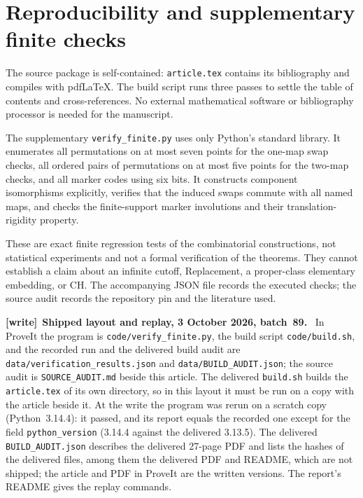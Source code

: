 \documentclass[11pt,letterpaper]{article}
\numberwithin{equation}{section}
\theoremstyle{plain}
\theoremstyle{definition}
\theoremstyle{remark}
\newenvironment{writenote}[1][]{\par\smallskip\begingroup\small\raggedright
 \setlength{\parindent}{1.25em}\noindent\textbf{[write]}\if\relax\detokenize{#1}\relax\else~\textbf{#1.}\fi\ }%
 {\par\endgroup\smallskip}
\begin{document}
\section{Reproducibility and supplementary finite checks}\label{nee:app:checks}
The source package is self-contained: \texttt{article.tex} contains its bibliography and compiles with pdfLaTeX. The build script runs three passes to settle the table of contents and cross-references. No external mathematical software or bibliography processor is needed for the manuscript.

The supplementary \texttt{verify\_finite.py} uses only Python's standard library. It enumerates all permutations on at most seven points for the one-map swap checks, all ordered pairs of permutations on at most five points for the two-map checks, and all marker codes using six bits. It constructs component isomorphisms explicitly, verifies that the induced swaps commute with all named maps, and checks the finite-support marker involutions and their translation-rigidity property.

These are exact finite regression tests of the combinatorial constructions, not statistical experiments and not a formal verification of the theorems. They cannot establish a claim about an infinite cutoff, Replacement, a proper-class elementary embedding, or CH. The accompanying JSON file records the executed checks; the source audit records the repository pin and the literature used.

\begin{writenote}[Shipped layout and replay, 3 October 2026, batch~89]
In ProveIt the program is \nolinkurl{code/verify_finite.py}, the build script \nolinkurl{code/build.sh}, and the recorded run and the delivered build audit are \nolinkurl{data/verification_results.json} and \nolinkurl{data/BUILD_AUDIT.json}; the source audit is \nolinkurl{SOURCE_AUDIT.md} beside this article. The delivered \texttt{build.sh} builds the \texttt{article.tex} of its own directory, so in this layout it must be run on a copy with the article beside it. At the write the program was rerun on a scratch copy (Python~3.14.4): it passed, and its report equals the recorded one except for the field \texttt{python\_version} (3.14.4 against the delivered 3.13.5). The delivered \texttt{BUILD\_AUDIT.json} describes the delivered 27-page PDF and lists the hashes of the delivered files, among them the delivered PDF and README, which are not shipped; the article and PDF in ProveIt are the written versions. The report's README gives the replay commands.
\end{writenote}
\end{document}

